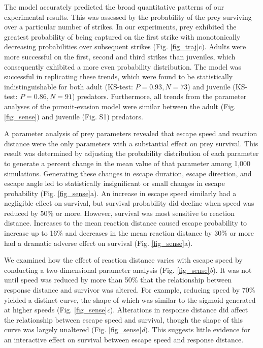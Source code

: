 \documentclass[]{rsos}%
\begin{document}
The model accurately predicted the broad quantitative patterns of our experimental results.
This was assessed by the probability of the prey surviving over a particular number of strikes. 
In our experiments, prey exhibited the greatest probability of being captured on the first strike with monotonically decreasing probabilities over subsequent strikes (Fig. \ref{fig_traj}c).
Adults were more successful on the first, second and third strikes than juveniles, which consequently exhibited a more even probability distribution.
The model was successful in replicating these trends, which were found to be statistically indistinguishable for both adult (KS-test: $P = 0.93, N = 73$) and juvenile (KS-test: $P = 0.86, N = 91$) predators. 
Furthermore, all trends from the parameter analyses of the pursuit-evasion model were similar between the adult (Fig. \ref{fig_sense}) and juvenile (Fig. S1) predators. 

A parameter analysis of prey parameters revealed that escape speed and reaction distance were the only parameters with a substantial effect on prey survival. 
This result was determined by adjusting the probability distribution of each parameter to generate a percent change in the mean value of that parameter among 1,000 simulations.
Generating these changes in escape duration, escape direction, and escape angle led to statistically insignificant or small changes in escape probability (Fig. \ref{fig_sense}a). 
An increase in escape speed similarly had a negligible effect on survival, but survival probability did decline when speed was reduced by 50\% or more.
However, survival was most sensitive to reaction distance.
Increases to the mean reaction distance caused escape probability to increase up to 16\% and decreases in the mean reaction distance by 30\% or more had a dramatic adverse effect on survival (Fig. \ref{fig_sense}a). 

We examined how the effect of reaction distance varies with escape speed by conducting a two-dimensional parameter analysis (Fig. \ref{fig_sense}\textit{b}).
It was not until speed was reduced by more than 50\% that the relationship between response distance and survivor was altered.
For example, reducing speed by 70\% yielded a distinct curve, the shape of which was similar to the sigmoid generated at higher speeds (Fig. \ref{fig_sense}\textit{c}). 
Alterations in response distance did affect the relationship between escape speed and survival, though the shape of this curve was largely unaltered (Fig. \ref{fig_sense}\textit{d}).
This suggests little evidence for an interactive effect on survival between escape speed and response distance.
\end{document}
